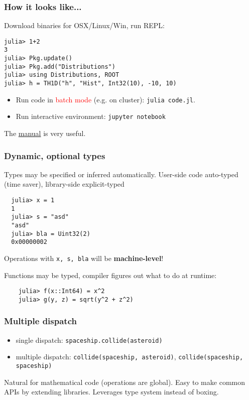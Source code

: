 \documentclass[16pt]{beamer}
\begin{document}
\begin{frame}[fragile]
  \frametitle{How it looks like...}
  Download binaries for OSX/Linux/Win, run REPL:
  \begin{lstlisting}
julia> 1+2
3
julia> Pkg.update()
julia> Pkg.add("Distributions")
julia> using Distributions, ROOT
julia> h = TH1D("h", "Hist", Int32(10), -10, 10)
  \end{lstlisting}
  \begin{itemize}
    \item Run code in \textcolor{red}{batch mode} (e.g. on cluster): \texttt{julia code.jl}.
    \item Run interactive environment: \texttt{jupyter notebook} 
  \end{itemize}

  The \href{http://docs.julialang.org/en/release-0.4/manual/}{manual} is very useful.
\end{frame}


\begin{frame}[fragile]
  \frametitle{Dynamic, optional types}

  \begin{centering}

  Types may be specified or inferred automatically.
  User-side code auto-typed (time saver), library-side explicit-typed
  \begin{lstlisting}
  julia> x = 1
  1
  julia> s = "asd"
  "asd"
  julia> bla = Uint32(2)
  0x00000002
  \end{lstlisting}
  Operations with \texttt{x, s, bla} will be \textbf{machine-level}!

  Functions may be typed, compiler figures out what to do at runtime:
  \begin{lstlisting}
    julia> f(x::Int64) = x^2
    julia> g(y, z) = sqrt(y^2 + z^2)
  \end{lstlisting}
  \end{centering}
\end{frame}

\begin{frame}[fragile]
  \frametitle{Multiple dispatch}
  \begin{itemize}
  \item single dispatch: \verb|spaceship.collide(asteroid)|
  \item multiple dispatch: \verb|collide(spaceship, asteroid)|, \verb|collide(spaceship, spaceship)|
  \end{itemize}

  Natural for mathematical code (operations are global). Easy to make common APIs by extending libraries. Leverages type system instead of boxing.
  \begin{centering}
  \end{centering}
\end{frame}
\end{document}
